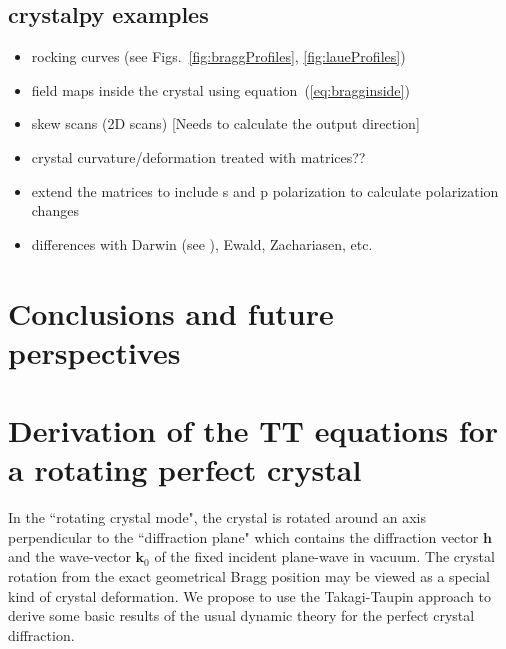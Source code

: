 \documentclass[preprint]{iucr}              %
\begin{document}
\subsection{crystalpy examples}

\begin{itemize}
    \item rocking curves (see Figs.~\ref{fig:braggProfiles}, \ref{fig:laueProfiles})
    \item field maps inside the crystal using equation~(\ref{eq:bragginside})
    \item skew scans (2D scans) [Needs to calculate the output direction]
    \item crystal curvature/deformation treated with matrices??
    \item extend the matrices to include s and p polarization to calculate polarization changes
    \item differences with Darwin (see \cite{Yashiro2000, Yashiro2001}), Ewald, Zachariasen, etc. 

\end{itemize}



\section{Conclusions and future perspectives}
\label{sec:summary}







\appendix

\section{Derivation of the TT equations for a rotating perfect crystal}
\label{appendix:rotating}

In the ``rotating crystal mode", the crystal is rotated around an axis perpendicular to the ``diffraction plane" which contains the diffraction vector $\textbf{h}$ and the wave-vector $\textbf{k}_0$ of the fixed incident plane-wave in vacuum. The crystal rotation from the exact geometrical Bragg position may be viewed as a special kind of crystal deformation. We propose to use the Takagi-Taupin approach to derive some basic results of the usual dynamic theory for the perfect crystal diffraction. 
\end{document}
